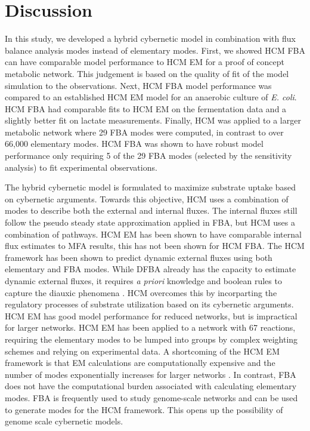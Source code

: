 \documentclass[10pt,twocolumn,twoside,final]{IEEEtran}
\begin{document}
\section{Discussion}
In this study, we developed a hybrid cybernetic model in combination with flux balance analysis modes instead of elementary modes.
First, we showed HCM FBA can have comparable model performance to HCM EM for a proof of concept metabolic network.
This judgement is based on the quality of fit of the model simulation to the observations.
Next, HCM FBA model performance was compared to an established HCM EM model\cite{2008_kim_varner_ramkrishna_BiotechProg} for an anaerobic culture of \textit{E. coli}.
HCM FBA had comparable fits to HCM EM on the fermentation data and a slightly better fit on lactate measurements.
Finally, HCM was applied to a larger metabolic network where 29 FBA modes were computed, in contrast to over 66,000 elementary modes.
HCM FBA was shown to have robust model performance only requiring 5 of the 29 FBA modes (selected by the sensitivity analysis) to fit experimental observations.

The hybrid cybernetic model is formulated to maximize substrate uptake based on cybernetic arguments.
Towards this objective, HCM uses a combination of modes to describe both the external and internal fluxes.
The internal fluxes still follow the pseudo steady state approximation applied in FBA, but HCM uses a combination of pathways.
HCM EM has been shown to have comparable internal flux estimates to MFA results\cite{2008_kim_varner_ramkrishna_BiotechProg}, this has not been shown for HCM FBA.
The HCM framework has been shown to predict dynamic external fluxes using both elementary and FBA modes.
While DFBA already has the capacity to estimate dynamic external fluxes, it requires \textit{a priori} knowledge and boolean rules to capture the diauxic phenomena \cite{1994_varma_palsson_ApplEnvMicro,2002_Mahadevan_BiophysJ,2001_covert_schilling_palsson}.
HCM overcomes this by incorparting the regulatory processes of substrate utilization based on its cybernetic arguments.
HCM EM has good model performance for reduced networks, but is impractical for larger networks.
HCM EM has been applied to a network with 67 reactions, requiring the elementary modes to be lumped into groups by complex weighting schemes and relying on experimental data\cite{2010_song_ramkrishna}.
A shortcoming of the HCM EM framework is that EM calculations are computationally expensive and the number of modes exponentially increases for larger networks \cite{2004_lee_varner_ko_ieee}.
In contrast, FBA does not have the computational burden associated with calculating elementary modes.
FBA is frequently used to study genome-scale networks\cite{2010_orth_NatBiotech} and can be used to generate modes for the HCM framework.
This opens up the possibility of genome scale cybernetic models.
\end{document}
